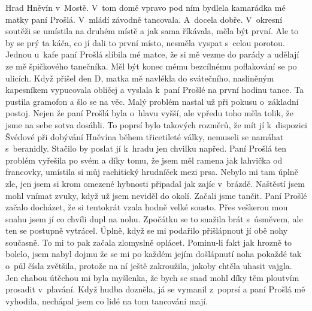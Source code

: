 
Hrad Hněvín v~Mostě. V~tom domě vpravo pod ním bydlela kamarádka mé
matky paní Prošlá. V~mládí závodně tancovala. A~docela dobře.
V~okresní soutěži se umístila na druhém místě a jak sama říkávala, měla
být první. Ale to by se prý ta káča, co jí dali to první místo,
nesměla vyspat s~celou porotou. Jednou u~kafe paní Prošlá slíbila mé
matce, že si mě vezme do parády a udělají ze mě špičkového tanečníka.
Měl být konec mému bezcílnému poflakování se po ulicích. Když přišel
den D, matka mě navlékla do svátečního, nasliněným kapesníkem
vypucovala obličej a vyslala k~paní Prošlé na první hodinu tance. Ta
pustila gramofon a šlo se na věc. Malý problém nastal už při pokusu
o~základní postoj. Nejen že paní Prošlá byla o~hlavu vyšší, ale vpředu
toho měla tolik, že jsme na sebe sotva dosáhli. To poprsí bylo
takových rozměrů, že mít jí k~dispozici Švédové při dobývání Hněvína
během třicetileté války, nemuseli se namáhat s~beranidly. Stačilo by
poslat jí k~hradu jen chvilku napřed. Paní Prošlá ten problém vyřešila
po svém a díky tomu, že jsem měl ramena jak lahvička od francovky,
umístila si můj rachitický hrudníček mezi prsa. Nebylo mi tam úplně
zle, jen jsem si krom omezené hybnosti připadal jak zajíc v~brázdě.
Naštěstí jsem mohl vnímat zvuky, když už jsem neviděl do okolí. Začali
jsme tančit. Paní Prošlé začalo docházet, že si tentokrát vzala hodně
velké sousto. Přes veškerou mou snahu jsem jí co chvíli dupl na nohu.
Zpočátku se to snažila brát s~úsměvem, ale ten se postupně vytrácel.
Úplně, když se mi podařilo přišlápnout jí obě nohy současně. To mi to
pak začala zlomyslně oplácet. Pominu-li fakt jak hrozně to bolelo,
jsem nabyl dojmu že se mi po každém jejím došlápnutí noha pokaždé tak
o~půl čísla zvětšila, protože na ní ještě zakroužila, jakoby chtěla
uhasit vajgla. Jen chabou útěchou mi byla myšlenka, že bych se snad
mohl díky těm ploutvím prosadit v~plavání. Když hudba dozněla, já se
vymanil z~poprsí a paní Prošlá mě vyhodila, nechápal jsem co lidé na
tom tancování mají.
